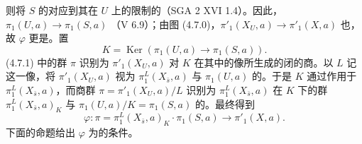 则将 $S$ 的对应到其在 $U$ 上的限制的（SGA 2 XVI 1.4）。因此， $\pi_1(U,a)\to\pi_1(S,a)$ （V 6.9）；由图 (4.7.0)，$\pi'_1(X_U,a)\to\pi'_1(X,a)$ 也，故 $\varphi$ 更是。置
\[K=\operatorname{Ker}(\pi_1(U,a)\longrightarrow\pi_1(S,a)).\tag{4.7.2}\]
(4.7.1) 中的群 $\pi$ 识别为 $\pi'_1(X_U,a)$ 对 $K$ 在其中的像所生成的闭的商。以 $L$ 记这一像，将 $\pi'_1(X_U,a)$ 视为 $\pi_1^L(X_{\bar s},a)$ 与 $\pi_1(U,a)$ 的。于是 $K$ 通过作用于 $\pi_1^L(X_{\bar s},a)$，而商群 $\pi=\pi'_1(X_U,a)/L$ 识别为 $\pi_1^L(X_{\bar s},a)$ 在 $K$ 下的群 $\pi_1^L(X_{\bar s},a)_K$ 与 $\pi_1(U,a)/K=\pi_1(S,a)$ 的。最终得到
\[\varphi:\pi=\pi_1^L(X_{\bar s},a)_K\cdot\pi_1(S,a)\longrightarrow\pi'_1(X,a).\tag{4.7.3}\]
下面的命题给出 $\varphi$ 为的条件。

